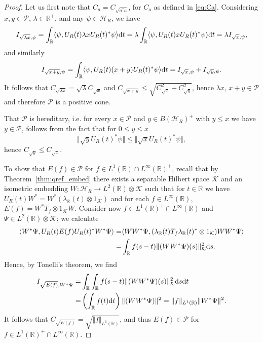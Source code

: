 \documentclass[sn-mathphys-num]{sn-jnl}%
\newcommand{\RR}{\mathbb{R}}
\newcommand{\HH}{\mathcal{H}}
\newcommand{\KK}{\mathcal{K}}
\newcommand{\diff}{\textup{d}}
\numberwithin{equation}{section}
\theoremstyle{thmstyleone}%
\theoremstyle{thmstyletwo}%
\theoremstyle{thmstylethree}%
\begin{document}
\begin{proof}
    Let us first note that $C_a=C_{\sqrt{a^*a}}$, for $C_a$ as defined in \eqref{eq:Ca}. Considering $x,y\in\mathcal{P}$, $\lambda\in \RR^+$, and any $\psi\in \HH_R$, we have
    \begin{equation}
        I_{\sqrt{\lambda x},\psi}=\int_\RR \langle\psi, U_R(t)\lambda xU_R(t)^*\psi\rangle\diff t=\lambda\int_\RR \langle\psi, U_R(t)xU_R(t)^*\psi\rangle\diff t=\lambda I_{\sqrt{x},\psi},
    \end{equation}
    and similarly
    \begin{equation}
        I_{\sqrt{x+y},\psi}=\int_\RR \langle\psi, U_R(t)(x+y)U_R(t)^*\psi\rangle\diff t= I_{\sqrt{x},\psi}+I_{\sqrt{y},\psi}.
    \end{equation}
    It follows that $C_{\sqrt{\lambda x}}=\sqrt{\lambda}C_{\sqrt{x}}$ and $C_{\sqrt{x+y}}\leq \sqrt{C_{\sqrt{x}}^2+C_{\sqrt{y}}^2}$, hence $\lambda x,\,x+y\in\mathcal{P}$ and therefore $\mathcal{P}$ is a positive cone. 

    That $\mathcal{P}$ is hereditary, i.e. for every $x\in \mathcal{P}$ and $y\in B(\HH_R)^+$ with $y\leq x$ we have $y\in\mathcal{P}$, follows from the fact that for $0\leq y\leq x$
    \begin{equation}
        \Vert \sqrt{y}U_R(t)^*\psi\Vert\leq \Vert \sqrt{x}U_R(t)^*\psi\Vert,
    \end{equation}
    hence $C_{\sqrt{y}}\leq C_{\sqrt{x}}$.

    To show that $E(f)\in\mathcal{P}$ for $f\in L^1(\RR)\cap L^\infty(\RR)^+$, recall that by Theorem~\ref{thm:qref_embed} there exists a separable Hilbert space $\KK$ and an isometric embedding $W:\HH_R\to L^2(\RR)\otimes\KK$ such that for $t\in \RR$ we have $U_R(t)W^*=W^*(\lambda_\RR(t)\otimes 1_{\KK})$ and for each $f\in L^\infty(\RR)$, $E(f)=W^* T_{f}\otimes 1_{\KK} W$. Consider now $f\in L^1(\RR)^+\cap L^\infty(\RR)$ and $\Psi\in L^2(\RR)\otimes \KK$; we calculate
    \begin{align}
        \langle W^*\Psi,U_R(t)E(f)U_R(t)^*W^*\Psi\rangle =& \langle WW^*\Psi, (\lambda_{\RR}(t)T_{f}\lambda_\RR(t)^*\otimes 1_{\KK}) WW^*\Psi\rangle\nonumber\\
        =&\int_\RR f(s-t)\Vert (WW^*\Psi)(s)\Vert_\KK^2\diff s.
    \end{align}
    Hence, by Tonelli's theorem, we find
    \begin{align}
    \label{eq:Ef_integral}
        I_{\sqrt{E(f)},W^*\Psi}=&\int_\RR\int_\RR f(s-t)\Vert (WW^*\Psi)(s)\Vert_\KK^2\diff s\diff t\nonumber\\
        =&\left(\int_\RR f(t)\diff t\right)\Vert (WW^*\Psi)\Vert^2
        =\Vert f\Vert_{L^1(\RR)}\Vert W^*\Psi\Vert^2.
    \end{align}
    It follows that $C_{\sqrt{E(f)}}=\sqrt{\Vert f\Vert_{L^1(\RR)}}$, and thus $E(f)\in\mathcal{P}$ for $f\in L^1(\RR)^+\cap L^\infty(\RR)$.


\end{proof}
\end{document}
